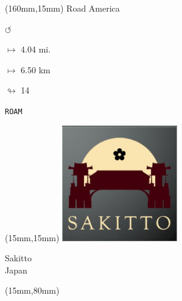 \begin{textblock*}{40mm}(160mm,15mm)%
Road America
\par \Huge$\circlearrowleft$
\Large
\par$\mapsto$ 4.04 mi.
\par$\mapsto$ 6.50 km
\par$\looparrowright$ 14
\par\hfill\tiny\tt ROAM\\
\end{textblock*}
\null\newpage

\begin{textblock*}{50mm}(15mm,15mm)%
\includegraphics[width=50mm]{LG/2015-05-20_00093.png}
\par Sakitto\\ Japan
\end{textblock*}
\begin{textblock*}{185mm}(15mm,80mm)%
\end{textblock*}
